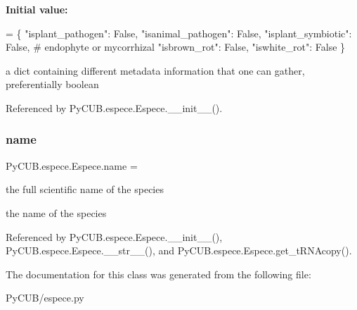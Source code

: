 {\bfseries Initial value\+:}
\begin{DoxyCode}
=  \{
        \textcolor{stringliteral}{"isplant\_pathogen"}: \textcolor{keyword}{False},
        \textcolor{stringliteral}{"isanimal\_pathogen"}: \textcolor{keyword}{False},
        \textcolor{stringliteral}{"isplant\_symbiotic"}: \textcolor{keyword}{False},  \textcolor{comment}{# endophyte or mycorrhizal}
        \textcolor{stringliteral}{"isbrown\_rot"}: \textcolor{keyword}{False},
        \textcolor{stringliteral}{"iswhite\_rot"}: \textcolor{keyword}{False}
    \}
\end{DoxyCode}


a dict containing different metadata information that one can gather, preferentially boolean 



Referenced by Py\+C\+U\+B.\+espece.\+Espece.\+\_\+\+\_\+init\+\_\+\+\_\+().

\mbox{\label{class_py_c_u_b_1_1espece_1_1_espece_a3a33da4c7b0c9163b8673166b306226c}} 
\subsubsection{\texorpdfstring{name}{name}}
{\footnotesize\ttfamily Py\+C\+U\+B.\+espece.\+Espece.\+name = \textquotesingle{}\textquotesingle{}\hspace{0.3cm}{\ttfamily [static]}}



the full scientific name of the species 

the name of the species 

Referenced by Py\+C\+U\+B.\+espece.\+Espece.\+\_\+\+\_\+init\+\_\+\+\_\+(), Py\+C\+U\+B.\+espece.\+Espece.\+\_\+\+\_\+str\+\_\+\+\_\+(), and Py\+C\+U\+B.\+espece.\+Espece.\+get\+\_\+t\+R\+N\+Acopy().



The documentation for this class was generated from the following file\+:\begin{DoxyCompactItemize}
\item 
Py\+C\+U\+B/espece.\+py\end{DoxyCompactItemize}
